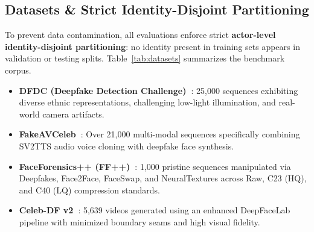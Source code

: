 \documentclass[journal]{IEEEtran}
\begin{document}
\begin{table}[!t]
\caption{Multi-Modal Deepfake Benchmark Corpus Specifications and Partitioning Protocols}
\label{tab:datasets}
\centering
{}
\end{table}

\subsection{Datasets \& Strict Identity-Disjoint Partitioning}
To prevent data contamination, all evaluations enforce strict \textbf{actor-level identity-disjoint partitioning}: no identity present in training sets appears in validation or testing splits. Table~\ref{tab:datasets} summarizes the benchmark corpus.
\begin{itemize}
    \item \textbf{DFDC (Deepfake Detection Challenge)~\cite{dolhansky2020deepfake}}: 25,000 sequences exhibiting diverse ethnic representations, challenging low-light illumination, and real-world camera artifacts.
    \item \textbf{FakeAVCeleb~\cite{khalid2021fakeavceleb}}: Over 21,000 multi-modal sequences specifically combining SV2TTS audio voice cloning with deepfake face synthesis.
    \item \textbf{FaceForensics++ (FF++)~\cite{rossler2019faceforensics}}: 1,000 pristine sequences manipulated via Deepfakes, Face2Face, FaceSwap, and NeuralTextures across Raw, C23 (HQ), and C40 (LQ) compression standards.
    \item \textbf{Celeb-DF v2~\cite{li2020celeb}}: 5,639 videos generated using an enhanced DeepFaceLab pipeline with minimized boundary seams and high visual fidelity.
\end{itemize}
\end{document}
